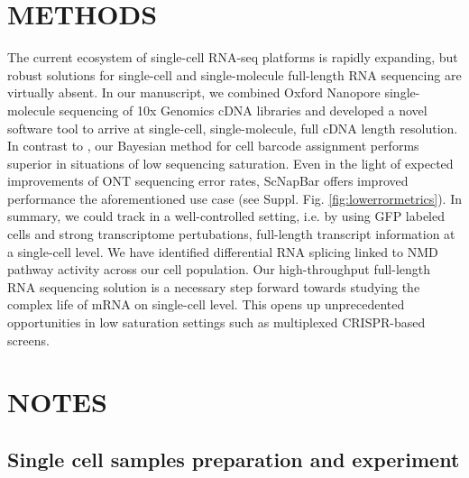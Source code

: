 \documentclass[times, 11pt, a4paper]{article}
\begin{document}
\section*{METHODS}
The current ecosystem of single-cell RNA-seq platforms is rapidly expanding, but robust solutions for single-cell and single-molecule full-length RNA sequencing are virtually absent. In our manuscript, we combined Oxford Nanopore single-molecule sequencing of 10x Genomics cDNA libraries and developed a novel software tool to arrive at single-cell, single-molecule, full cDNA length resolution. In contrast to , our Bayesian method for cell barcode assignment performs superior in situations of low sequencing saturation.
Even in the light of expected improvements of ONT sequencing error rates, ScNapBar offers improved performance the aforementioned use case (see Suppl. Fig. \ref{fig:lowerrormetrics}).  In summary, we could track in a well-controlled setting, i.e. by using GFP labeled cells and strong transcriptome pertubations, full-length transcript information at a single-cell level. We have identified differential RNA splicing linked to NMD pathway activity across our cell population. Our high-throughput full-length RNA sequencing solution is a necessary step forward towards studying the complex life of mRNA on single-cell level. This opens up unprecedented opportunities in low saturation settings such as multiplexed CRISPR-based screens.

\section*{NOTES}
\subsection*{Single cell samples preparation and experiment}
\end{document}
